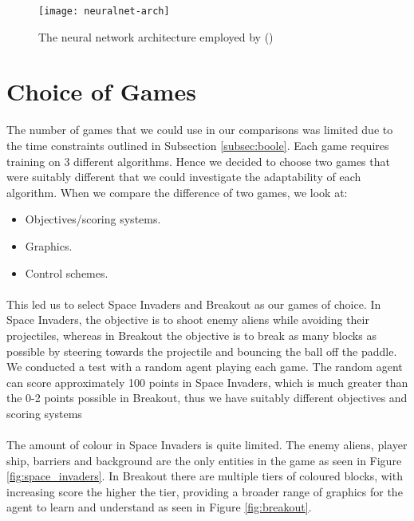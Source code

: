 \begin{figure}[h]
    \centering
    \texttt{[image: neuralnet-arch]}
    \caption{The neural network architecture employed by (\citet{human})}
    \label{fig:nnarch}
\end{figure}

\section{Choice of Games}
The number of games that we could use in our comparisons was limited due to the time constraints outlined in Subsection \ref{subsec:boole}. Each game requires training on 3 different algorithms. Hence we decided to choose two games that were suitably different that we could investigate the adaptability of each algorithm. When we compare the difference of two games, we look at:

\begin{itemize}
    \item Objectives/scoring systems.
    \item Graphics.
    \item Control schemes.
\end{itemize} \paragraph{}

This led us to select Space Invaders \cite{space-invaders} and Breakout \cite{breakout} as our games of choice. In Space Invaders, the objective is to shoot enemy aliens while avoiding their projectiles, whereas in Breakout the objective is to break as many blocks as possible by steering towards the projectile and bouncing the ball off the paddle. We conducted a test with a random agent playing each game. The random agent can score approximately 100 points in Space Invaders, which is much greater than the 0-2 points possible in Breakout, thus we have suitably different objectives and scoring systems \paragraph{}

The amount of colour in Space Invaders is quite limited. The enemy aliens, player ship, barriers and background are the only entities in the game as seen in Figure \ref{fig:space_invaders}. In Breakout there are multiple tiers of coloured blocks, with increasing score the higher the tier, providing a broader range of graphics for the agent to learn and understand as seen in Figure \ref{fig:breakout}. \paragraph{}

